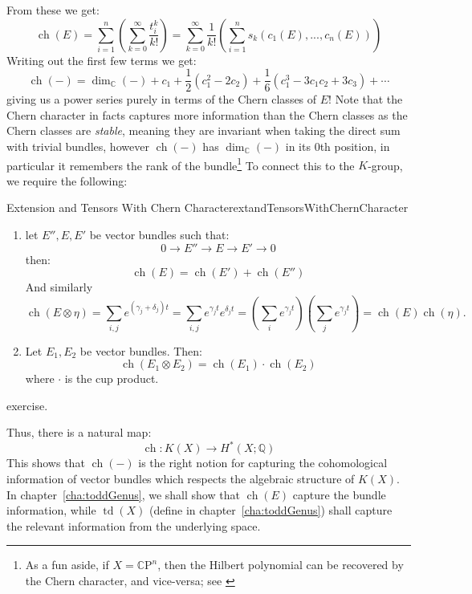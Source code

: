 \documentclass{book}
\newenvironment{Proof}[1][]
  {\begin{ProofTcb}[#1]}
  {\end{ProofTcb}}
\newcommand{\Q}{{\mathbb{Q}}}
\newcommand{\C}{{\mathbb{C}}}
\newcommand{\CP}{{\mathbb{C}\mathrm{P}}}
\newcommand{\ch}{{\operatorname{ch}}}
\newcommand{\td}{{\operatorname{td}}}
\renewcommand{\ch}{{\operatorname{ch}}}
\begin{document}
From these we get:
\[
\ch(E) = \sum_{i=1}^n \left(\sum_{k=0}^{\infty} \frac{t_i^k}{k!}\right) = \sum_{k=0}^{\infty}
\frac{1}{k!}\left(\sum_{i=1}^n s_k(c_1(E), ..., c_n(E))\right)
\]
Writing out the first few terms we get:
\[
  \ch(-) = \dim_\C(-) + c_1 + \frac{1}{2}(c_1^2 - 2c_2) + \frac{1}{6}(c_1^3 - 3c_1c_2 + 3c_3) + \cdots
\]
giving us a power series purely in terms of the Chern classes of $E$! Note that the Chern character in facts
captures more information than the Chern classes as the Chern classes are \emph{stable}, meaning they are
invariant when taking the direct sum with trivial bundles, however $\ch(-)$ has $\dim_\C(-)$ in its $0$th
position, in particular it remembers the rank of the bundle\footnote{As a fun aside, if $X = \CP^n$, then the
Hilbert polynomial can be recovered by the Chern character, and vice-versa; see \cite{chanCorresondenceHilbertPolynomial2004}} To connect this to the $K$-group, we
require the following:

\begin{prop}{Extension and Tensors With Chern Character}{extandTensorsWithChernCharacter}
  \begin{enumerate}
    \item let $E'', E, E'$ be vector bundles such that:
  \[
    0 \to E'' \to E \to E' \to 0
  \]
  then:
  \[
    \ch(E) = \ch(E') + \ch(E'')
  \]
  And similarly
  \[
      \operatorname{ch}(E \otimes \eta) = \sum_{i,j} e^{(\gamma_j+\delta_j)t} = \sum_{i,j} e^{\gamma_j t}e^{\delta_j t} = \left(\sum_i e^{\gamma_j t}\right)\left(\sum_j e^{\gamma_j t}\right) = \operatorname{ch}(E)\operatorname{ch}(\eta).
  \]
    \item Let $E_1, E_2$ be vector bundles. Then:
      \[
        \ch(E_1\otimes E_2) = \ch(E_1)\cdot \ch(E_2)
    \]
    where $\cdot$ is the cup product.
  \end{enumerate}
\end{prop}

\begin{Proof}
  exercise.
\end{Proof}

 Thus, there is a natural map:
\[
  \ch: K(X) \to H^*(X; \Q)
\]
This shows that $\ch(-)$ is the right notion for capturing the cohomological information of vector bundles which
respects the algebraic structure of $K(X)$. In chapter~\ref{cha:toddGenus}, we shall show that $\ch(E)$
capture the bundle information, while $\td(X)$ (define in chapter~\ref{cha:toddGenus}) shall capture the
relevant information from the underlying space.
\end{document}
